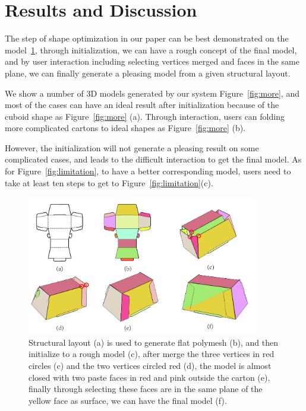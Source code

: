 \section{Results and Discussion}\label{sec:result}
{\color{red}{SS: Any need to list the number of steps we take to generate final model?}}

The step of shape optimization in our paper can be best demonstrated on the model~\ref{fig:result}, through initialization, we can have a rough concept of the final model, and by user interaction including selecting vertices merged and faces in the same plane, we can finally generate a pleasing model from a given structural layout.

We show a number of 3D models generated by our system Figure~\ref{fig:more}, and most of the cases can have an ideal result after initialization because of the cuboid shape as Figure~\ref{fig:more} (a). Through interaction, users can folding more complicated cartons to ideal shapes as Figure~\ref{fig:more} (b).

However, the initialization will not generate a pleasing result on some complicated cases, and leads to the difficult interaction to get the final model. As for Figure~\ref{fig:limitation}, to have a better corresponding model, users need to take at least ten steps to get to Figure~\ref{fig:limitation}(c). 


\begin{figure}
	\centering
	\includegraphics[width=0.9\textwidth]{images/result.jpg}
	\caption{Structural layout (a) is used to generate flat polymesh (b), and then initialize to a rough model (c), after merge the three vertices in red circles (c) and the two vertices circled red (d), the model is almost closed with two paste faces in red and pink outside the carton (e), finally through selecting these faces are in the same plane of the yellow face as surface, we can have the final model (f).}
	\label{fig:result}
\end{figure}

